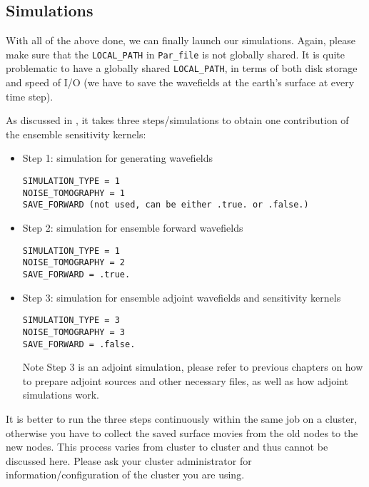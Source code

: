 \subsection{Simulations}

With all of the above done, we can finally launch our simulations.
Again, please make sure that the \texttt{LOCAL\_PATH} in \texttt{Par\_file}
is not globally shared. It is quite problematic to have a globally
shared \texttt{LOCAL\_PATH}, in terms of both disk storage and speed
of I/O (we have to save the wavefields at the earth's surface at every
time step).

As discussed in \citet{trompetal2010}, it takes three steps/simulations
to obtain one contribution of the ensemble sensitivity kernels:
\begin{itemize}
\item Step 1: simulation for generating wavefields
\begin{verbatim}
SIMULATION_TYPE = 1
NOISE_TOMOGRAPHY = 1
SAVE_FORWARD (not used, can be either .true. or .false.)
\end{verbatim}

\item Step 2: simulation for ensemble forward wavefields
\begin{verbatim}
SIMULATION_TYPE = 1
NOISE_TOMOGRAPHY = 2
SAVE_FORWARD = .true.
\end{verbatim}

\item Step 3: simulation for ensemble adjoint wavefields and sensitivity
kernels
\begin{verbatim}
SIMULATION_TYPE = 3
NOISE_TOMOGRAPHY = 3
SAVE_FORWARD = .false.
\end{verbatim}

Note Step 3 is an adjoint simulation, please refer to previous chapters
on how to prepare adjoint sources and other necessary files, as well
as how adjoint simulations work.

\end{itemize}

It is better to run the three steps continuously within
the same job on a cluster, otherwise you have to collect the saved surface movies
from the old nodes to the new nodes. This process varies
from cluster to cluster and thus cannot be discussed here. Please
ask your cluster administrator for information/configuration of the
cluster you are using.\newline



